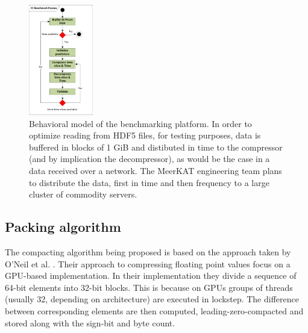 \begin{figure}[h!]
\begin{mdframed}
 \centering
 \includegraphics[width=0.25\textwidth]{Thesis_Flow.png}
 \caption[Process flow model of the benchmarking platform]{Behavioral model of the benchmarking platform. In order to optimize reading from HDF5 files, for testing purposes, data is buffered in blocks of 1 GiB and distibuted in time
 to the compressor (and by implication the decompressor), as would be the case in a data received over a network. The MeerKAT engineering team plans to distribute the data, first in time
 and then frequency to a large cluster of commodity servers.}
 \label{TOOL_FLOW}
\end{mdframed}
\end{figure}
\subsection{Packing algorithm}
The compacting algorithm being proposed is based on the approach taken by O'Neil et al. \cite{O'Neil:2011:FDC:1964179.1964189}. Their approach to compressing floating point values
focus on a GPU-based implementation. In their implementation they divide a sequence of 64-bit elements into 32-bit blocks. This is because on GPUs groups of threads (usually 32, depending on architecture) 
are executed in lockstep. The difference between corresponding elements are then computed, leading-zero-compacted and stored along with the sign-bit and byte count.

